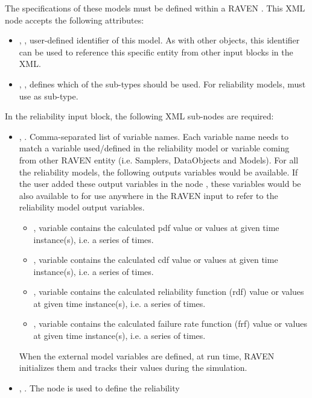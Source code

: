 The specifications of these models must be defined within a RAVEN . This
XML node accepts the following attributes:
\begin{itemize}
	\item {}, , user-defined identifier of this model.
	\nb As with other objects, this identifier can be used to reference this specific entity from other
	input blocks in the XML.
	\item {}, , defines which of the sub-types should
	be used. For reliability models, must use  as sub-type.
\end{itemize}
In the reliability  input block, the following XML sub-nodes are required:
\begin{itemize}
	\item {}, . Comma-separated list of variable
	names. Each variable name needs to match a variable used/defined in the reliability model or variable
	coming from other RAVEN entity (i.e. Samplers, DataObjects and Models).
	\nb For all the reliability models, the following outputs variables would be available. If the user
	added these output variables in the node , these variables would be also available to
	for use anywhere in the RAVEN input to refer to the reliability model output variables.
	\begin{itemize}
		\item {}, variable contains the calculated pdf value or values at given time instance(s),
		i.e. a series of times.
		\item {}, variable contains the calculated cdf value or values at given time instance(s),
		i.e. a series of times.
		\item {}, variable contains the calculated reliability function (rdf) value or values at
		given time instance(s), i.e. a series of times.
		\item {}, variable contains the calculated failure rate function (frf) value or values
		at given time instance(s), i.e. a series of times.
	\end{itemize}
	\nb When the external model variables are defined, at run time, RAVEN initializes
	them and tracks their values during the simulation.
	\item {}, . The node is used to define the reliability

\end{itemize}
